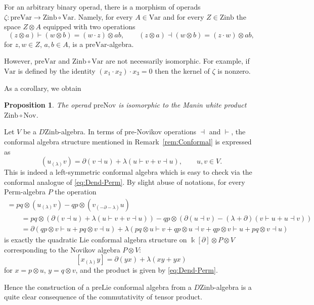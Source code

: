 \documentclass[pdftex]{sigma}
\numberwithin{equation}{section}
\newtheorem{Proposition}[Theorem]{Proposition}
 { \theoremstyle{definition}
\newtheorem{Definition}[Theorem]{Definition}
\newtheorem{Note}[Theorem]{Note}
\newtheorem{Example}[Theorem]{Example}
\newtheorem{Remark}[Theorem]{Remark} }
\def\Var{\mathrm{Var}}
\def\Nov{\mathrm{Nov}}
\def\Lie{\mathrm{Lie}}
\def\Perm{\mathrm{Perm}}
\def\Zinb{\mathrm{Zinb}}
\def\pre{\mathrm{pre}}
\begin{document}
\begin{Remark}
For an arbitrary binary operad,
there is a morphism of operads
$\zeta\colon \pre\Var \to \Zinb\circ \Var $. Namely,
for every $A\in \Var $ and for every $Z\in \Zinb$
the space $Z\otimes A$ equipped with two operations
\[
(z\otimes a)\vdash (w\otimes b) = (w\cdot z)\otimes ab,
\qquad
(z\otimes a)\dashv (w\otimes b) = (z\cdot w)\otimes ab,
\]
for $z,w\in Z$, $a,b\in A$, is a $\pre\Var $-algebra.

However, $\pre\Var $ and $\Zinb\circ \Var $ are
not necessarily isomorphic. For example,
if $\Var $ is defined by the identity $(x_1\cdot x_2)\cdot x_3=0$
then the kernel of $\zeta $ is nonzero.
\end{Remark}

As a corollary, we obtain

\begin{Proposition}%
The operad $\pre\Nov $
is isomorphic to the Manin white product $\Zinb\circ \Nov$.
\end{Proposition}

\begin{Remark}
Let $V$ be a $D\Zinb$-algebra.
In terms of pre-Novikov operations $\dashv$ and $\vdash$, the conformal algebra structure mentioned in
Remark~\ref{rem:Conformal} is expressed as
\[
(u_{(\lambda)} v) = \partial (v\dashv u) + \lambda (u\vdash v + v\dashv u),
\qquad u,v\in V.
\]
This is indeed a left-symmetric conformal algebra which is easy
to check via the conformal analogue of \eqref{eq:Dend-Perm}.
By slight abuse of notations,
for every $\Perm $-algebra $P$ the operation
%
\begin{gather*}
[(p\otimes u)_{(\lambda) } (q\otimes v)]
= pq \otimes (u_{(\lambda )} v) - qp\otimes (v_{(-\partial-\lambda )} u) \\
\qquad{}=pq\otimes (\partial (v\dashv u) + \lambda (u\vdash v + v\dashv u))
-qp\otimes (\partial (u\dashv v) - (\lambda+\partial) (v\vdash u + u\dashv v))\\
\qquad{}=\partial (qp\otimes v\vdash u+pq\otimes v\dashv u)
+\lambda (pq\otimes u\vdash v +qp\otimes u\dashv v
+ qp\otimes v\vdash u + pq\otimes v\dashv u)
\end{gather*}
%
is exactly the quadratic Lie conformal algebra structure \cite{Xu1999}
on $\Bbbk [\partial ]\otimes P\otimes V$
corresponding to the Novikov algebra $P\otimes V$:
\[
[x_{(\lambda )} y] = \partial (y x) + \lambda (x y + y x)
\]
for $x=p\otimes u$, $y=q\otimes v$, and the product
is given by \eqref{eq:Dend-Perm}.

Hence the construction of a $\pre\Lie$ conformal algebra from a
$D\Zinb $-algebra is a quite clear consequence of
the commutativity of tensor product.
\end{Remark}
\end{document}

